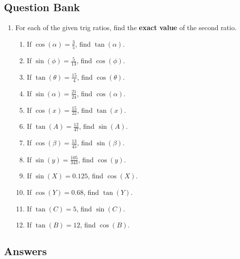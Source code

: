 \documentclass[a4paper,12pt]{article}
\begin{document}
\newpage
\subsection*{Question Bank}

\begin{enumerate}
\item For each of the given trig ratios, find the \textbf{exact 
value} of the second ratio.
    \begin{enumerate}
    \item If $\cos(\alpha) = \frac{3}{5}$, find $\tan(\alpha)$.
    \item If $\sin(\phi) = \frac{5}{13}$, find $\cos(\phi)$.
    \item If $\tan(\theta) = \frac{15}{4}$, find $\cos(\theta)$.
    \item If $\sin(\alpha) = \frac{21}{24}$, find $\cos(\alpha)$.
    \item If $\cos(x) = \frac{15}{22}$, find $\tan(x)$.
    \item If $\tan(A) = \frac{12}{47}$, find $\sin(A)$.
    \item If $\cos(\beta) = \frac{13}{45}$, find $\sin(\beta)$.
    \item If $\sin(y) = \frac{105}{343}$, find $\cos(y)$.

    \item If $\sin(X) = 0.125$, find $\cos(X)$.
    \item If $\cos(Y) = 0.68$, find $\tan(Y)$.
    \item If $\tan(C) = 5$, find $\sin(C)$.
    \item If $\tan(B) = 12$, find $\cos(B)$.
    \end{enumerate}
\end{enumerate}

\newpage
\subsection*{Answers}
\end{document}
